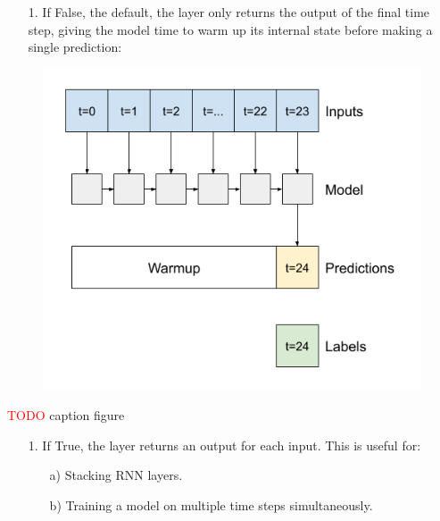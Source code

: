 \begin{itemize}
  \item[1.] If False, the default, the layer only returns the output of the final time step, giving the model time to warm up its internal state before making a single prediction:
\end{itemize}


\begin{figure}[H]
\centering
  \includegraphics[scale=0.35]{img/task_1/fig1.png}
  \caption{}
  \label{fig: }
\end{figure}

\textcolor{red}{TODO} caption figure

\begin{itemize}
  \item[1.] If True, the layer returns an output for each input. This is useful for:
  \begin{itemize}
     \item[a)] Stacking RNN layers.
     \item[b)] Training a model on multiple time steps simultaneously.
   \end{itemize}
\end{itemize}

